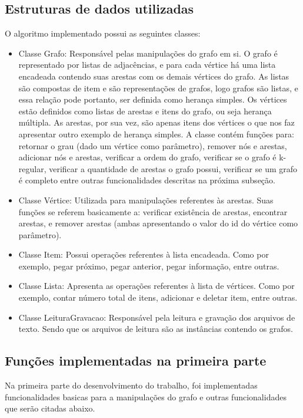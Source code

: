 \documentclass[12pt, fleqn]{article}
\begin{document}
      \subsection{Estruturas de dados utilizadas}	
	\par O algoritmo implementado possui as seguintes classes:
	  \begin{itemize}
	      \item Classe Grafo: Responsável pelas manipulações do grafo em si. 
	      O grafo é representado por listas de adjacências, e para cada vértice há uma lista encadeada contendo suas arestas com os demais vértices do grafo. 
	      As listas são compostas de item e são representações de grafos, logo grafos são listas, e essa relação pode portanto, ser definida como herança simples. 
	      Os vértices estão definidos como listas de arestas e itens do grafo, ou seja herança múltipla. As arestas, por sua vez, são apenas itens dos vértices o que nos faz apresentar outro exemplo de herança simples. 
	      A classe contém funções para: retornar o grau (dado um vértice como parâmetro), remover nós e arestas, adicionar nós e arestas, verificar a ordem do grafo,
	      verificar se o grafo é k-regular, verificar a quantidade de arestas o grafo possui, verificar se um grafo é completo entre outras funcionalidades descritas na próxima subseção.
	      
	      \item Classe Vértice: Utilizada para manipulações referentes às arestas. Suas funções se referem basicamente a: verificar existência de arestas,
	      encontrar arestas, e remover arestas (ambas apresentando o valor do id do vértice como parâmetro).
	      
	      \item Classe Item: Possui operações referentes à lista encadeada. Como por exemplo, pegar próximo, pegar anterior, pegar informação, entre outras.
	      
	      \item Classe Lista: Apresenta as operações referentes à lista de vértices. Como por exemplo, contar número total de itens, adicionar e deletar item, entre outras.
	      
	      \item Classe LeituraGravacao: Responsável pela leitura e gravação dos arquivos de texto. Sendo que os arquivos de leitura são as instâncias contendo os grafos. 
	  \end{itemize}

      \subsection{Funções implementadas na primeira parte}
	\par Na primeira parte do desenvolvimento do trabalho, 
	    foi implementadas funcionalidades basicas para a manipulações do grafo e outras funcionalidades que serão citadas abaixo. 
\end{document}
